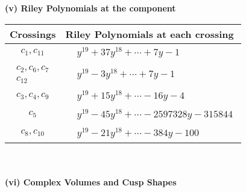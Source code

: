 \documentclass[1p]{elsarticle_modified}
\theoremstyle{definition}
\begin{document}
\flushleft \textbf{(v) Riley Polynomials at the component}\newline \\
\begin{tabular}{m{50pt}|m{274pt}}
Crossings & \hspace{64pt}Riley Polynomials at each crossing \\
\hline $$\begin{aligned}c_{1},c_{11}\end{aligned}$$&$\begin{aligned}
&y^{19}+37 y^{18}+\cdots+7 y-1
\end{aligned}$\\
\hline $$\begin{aligned}c_{2},c_{6},c_{7}\\c_{12}\end{aligned}$$&$\begin{aligned}
&y^{19}-3 y^{18}+\cdots+7 y-1
\end{aligned}$\\
\hline $$\begin{aligned}c_{3},c_{4},c_{9}\end{aligned}$$&$\begin{aligned}
&y^{19}+15 y^{18}+\cdots-16 y-4
\end{aligned}$\\
\hline $$\begin{aligned}c_{5}\end{aligned}$$&$\begin{aligned}
&y^{19}-45 y^{18}+\cdots-2597328 y-315844
\end{aligned}$\\
\hline $$\begin{aligned}c_{8},c_{10}\end{aligned}$$&$\begin{aligned}
&y^{19}-21 y^{18}+\cdots-384 y-100
\end{aligned}$\\
\hline
\end{tabular}\\~\\
\newpage\flushleft \textbf{(vi) Complex Volumes and Cusp Shapes}
\end{document}
